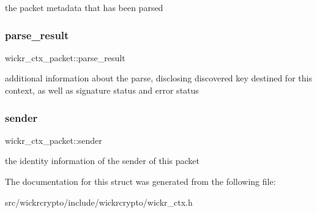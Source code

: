 the packet metadata that has been parsed \mbox{\label{structwickr__ctx__packet_a7bc4643a99b787536ee8b7505412ecce}} 
\subsubsection{\texorpdfstring{parse\_result}{parse\_result}}
{\footnotesize\ttfamily wickr\+\_\+ctx\+\_\+packet\+::parse\+\_\+result}

additional information about the parse, disclosing discovered key destined for this context, as well as signature status and error status \mbox{\label{structwickr__ctx__packet_ac57d2b0f48fc3dad5b72d408e30b7b8b}} 
\subsubsection{\texorpdfstring{sender}{sender}}
{\footnotesize\ttfamily wickr\+\_\+ctx\+\_\+packet\+::sender}

the identity information of the sender of this packet 

The documentation for this struct was generated from the following file\+:\begin{DoxyCompactItemize}
\item 
src/wickrcrypto/include/wickrcrypto/wickr\+\_\+ctx.\+h\end{DoxyCompactItemize}
